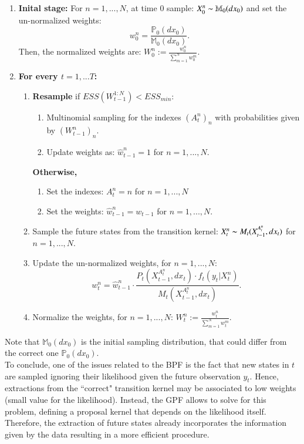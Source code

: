 \documentclass[
]{book}
\theoremstyle{break}
\theoremstyle{nonumberplain}
\begin{document}
\begin{enumerate}
    \item \textbf{Inital stage: }For $n=1,...,N$, at time 0 sample: $X_0^n\thicksim\mathbb M_0(dx_0)$ and set the un-normalized weights: 
    $$w_0^n=\frac{\mathbb P_0(dx_0)}{\mathbb M_0(dx_0)}.$$
    Then, the normalized weights are: $W_0^n:=\frac{w_0^n}{\sum_{m=1}^Nw_0^m}$.
    \item \textbf{For every $t=1,...T$:}
    \begin{enumerate}
        \item \textbf{Resample} if $ESS(W_{t-1}^{1:N})<ESS_{min}$:
\begin{enumerate}
    \item Multinomial sampling for the indexes $(A_t^n)_n$ with probabilities given by $(W_{t-1}^n)_n$.
    \item Update weights as: $\hat w_{t-1}^n = 1$ for $n=1,...,N$.
\end{enumerate}
\textbf{Otherwise, } 
\begin{enumerate}
    \item Set the indexes: $A_t^{n}=n$ for $n=1,...,N$
    \item Set the weights: $\hat w_{t-1}^n = w_{t-1}$ for $n=1,...,N$.
\end{enumerate}
\item Sample the future states from the transition kernel: $X_t^n\thicksim M_t(X_{t-1}^{A_t^n},dx_t)$ for $n=1,...,N$.
\item Update the un-normalized weights, for $n=1,...,N$:
\begin{equation*}
    w_t^n=\hat w_{t-1}^n\cdot \frac{P_t(X_{t-1}^{A_t^n},dx_t)\cdot f_t(y_t|X_t^n)}{ M_t(X_{t-1}^{A_t^n},dx_t)}.
\end{equation*}
\item Normalize the weights, for $n=1,...,N$:  $W_t^n:=\frac{w_t^n}{\sum_{m=1}^Nw_t^m}$.
    \end{enumerate}
\end{enumerate}

Note that \(\mathbb M_0(dx_0)\) is the initial sampling distribution,
that could differ from the correct one \(\mathbb P_0(dx_0)\).~\\
To conclude, one of the issues related to the BPF is the fact that new
states in \(t\) are sampled ignoring their likelihood given the future
observation \(y_t\). Hence, extractions from the ``correct" transition
kernel may be associated to low weights (small value for the
likelihood). Instead, the GPF allows to solve for this problem, defining
a proposal kernel that depends on the likelihood itself. Therefore, the
extraction of future states already incorporates the information given
by the data resulting in a more efficient procedure.
\end{document}
